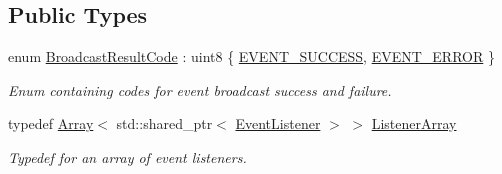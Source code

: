 \subsection*{Public Types}
\begin{DoxyCompactItemize}
\item 
enum \mbox{\hyperlink{class_arcana_1_1_event_handler_a1763837e7c9732fff7df0d4e48b3dbd4}{Broadcast\+Result\+Code}} \+: uint8 \{ \mbox{\hyperlink{class_arcana_1_1_event_handler_a1763837e7c9732fff7df0d4e48b3dbd4a8ea45dcfe2dfc827ecf65d103e18787c}{E\+V\+E\+N\+T\+\_\+\+S\+U\+C\+C\+E\+SS}}, 
\mbox{\hyperlink{class_arcana_1_1_event_handler_a1763837e7c9732fff7df0d4e48b3dbd4a27766aae597f40890345c45fc59dd7f0}{E\+V\+E\+N\+T\+\_\+\+E\+R\+R\+OR}}
 \}
\begin{DoxyCompactList}\small\item\em Enum containing codes for event broadcast success and failure. \end{DoxyCompactList}\item 
\mbox{\label{class_arcana_1_1_event_handler_a30e989dae18b9ac3c0bc01aedaea003e}} 
typedef \mbox{\hyperlink{class_arcana_1_1_array}{Array}}$<$ std\+::shared\+\_\+ptr$<$ \mbox{\hyperlink{class_arcana_1_1_event_listener}{Event\+Listener}} $>$ $>$ \mbox{\hyperlink{class_arcana_1_1_event_handler_a30e989dae18b9ac3c0bc01aedaea003e}{Listener\+Array}}
\begin{DoxyCompactList}\small\item\em Typedef for an array of event listeners. \end{DoxyCompactList}\end{DoxyCompactItemize}
